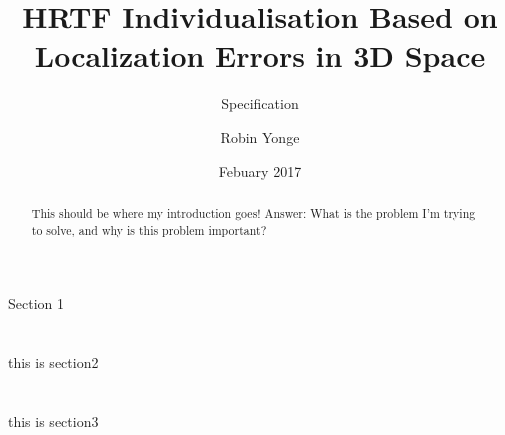 \documentclass[10pt, oneside, a4paper, draft]{scrartcl}
\begin{document}
\title{HRTF Individualisation Based on Localization Errors in 3D Space}
\subtitle{Specification}
\author{Robin Yonge}
\date{Febuary 2017}
\maketitle

\renewcommand{\abtractname}{Introduction} %
\begin {abstract}
This should be where my introduction goes! Answer: What is the problem I'm trying to solve, and why is this problem important?
\end {abstract}

\section*{}
Section 1

\section*{}
this is section2

\section*{}
this is section3
\end{document}
